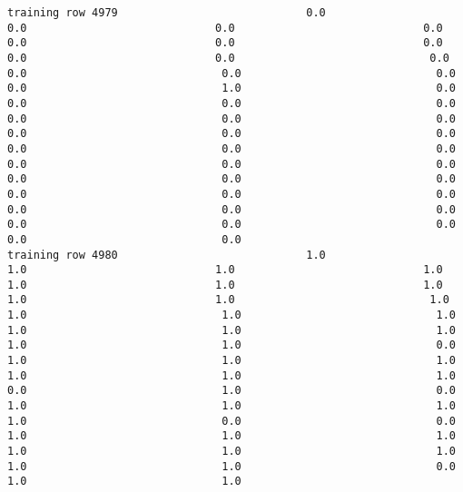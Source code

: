 \documentclass[11pt]{article}
\begin{document}
\begin{verbatim}
training row 4979                             0.0                             0.0                             0.0                             0.0                             0.0                             0.0                             0.0                             0.0                             0.0                              0.0                              0.0                              0.0                              0.0                              0.0                              1.0                              0.0                              0.0                              0.0                              0.0                              0.0                              0.0                              0.0                              0.0                              0.0                              0.0                              0.0                              0.0                              0.0                              0.0                              0.0                              0.0                              0.0                              0.0                              0.0                              0.0                              0.0                              0.0                              0.0                              0.0                              0.0                              0.0                              0.0                              0.0                              0.0                              0.0
training row 4980                             1.0                             1.0                             1.0                             1.0                             1.0                             1.0                             1.0                             1.0                             1.0                              1.0                              1.0                              1.0                              1.0                              1.0                              1.0                              1.0                              1.0                              1.0                              0.0                              1.0                              1.0                              1.0                              1.0                              1.0                              1.0                              0.0                              1.0                              0.0                              1.0                              1.0                              1.0                              1.0                              0.0                              0.0                              1.0                              1.0                              1.0                              1.0                              1.0                              1.0                              1.0                              1.0                              0.0                              1.0                              1.0

\end{verbatim}
\end{document}
